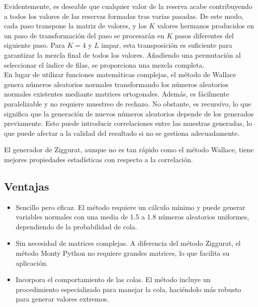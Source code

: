 Evidentemente, es deseable que cualquier valor de la reserva acabe contribuyendo a todos los valores de las reservas formadas tras varias pasadas. De este modo, cada paso transpone la matriz de valores, y los $K$ valores hermanos producidos en un paso de transformación del paso se procesarán en $K$
pasos diferentes del siguiente paso. Para $K = 4$ y $L$ impar, esta transposición es suficiente para garantizar la mezcla final de todos los valores. Añadiendo una permutación al seleccionar el índice de filas, se proporciona una mezcla completa.\\

En lugar de utilizar funciones matemáticas complejas, el método de Wallace genera números aleatorios normales transformando los números aleatorios normales existentes mediante matrices ortogonales. Además, es fácilmente paralelizable y no requiere muestreo de rechazo. No obstante, es recursivo, lo que significa que la generación de nuevos números aleatorios depende de los generados previamente. Esto puede introducir correlaciones entre las muestras generadas,
lo que puede afectar a la calidad del resultado si no se gestiona adecuadamente.

El generador de Ziggurat, aunque no es tan rápido como el método Wallace, tiene mejores propiedades estadísticas con respecto a la correlación.

\subsection{Ventajas}
\begin{itemize}
    \item Sencillo pero eficaz. El método requiere un cálculo mínimo y puede generar variables normales con una media de 1.5 a 1.8 números aleatorios uniformes, dependiendo de la probabilidad de cola.
    \item Sin necesidad de matrices complejas. A diferencia del método Ziggurat, el método Monty Python no requiere grandes matrices, lo que facilita su aplicación.
    \item Incorpora el comportamiento de las colas. El método incluye un procedimiento especializado para manejar la cola, haciéndolo más robusto para generar valores extremos.
\end{itemize}

